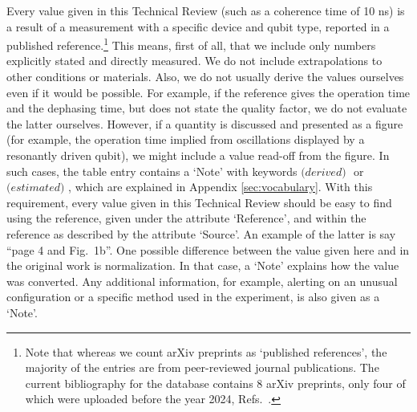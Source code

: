 \documentclass[aps, prx, showpacs, twocolumn, superscriptaddress, notitlepage, longbibliography, floatfix, nofootinbib]{revtex4-2}
\newcommand{\estimated}{\textit{(estimated) }}
\newcommand{\derived}{\textit{(derived) }}
\newcommand{\myKey}[1]{$\whitearrowupfrombar$\textit{#1}}
\renewcommand{\myKey}[1]{\textit{#1}}
\renewcommand{\myKey}[1]{`{#1}'}
\newcommand{\recheck}[1]{{#1}}
\begin{document}
Every value given in this Technical Review (such as a coherence time of 10 ns) is a result of a measurement with a specific device and qubit type, reported in a published reference.\footnote{\recheck{Note that whereas we count arXiv preprints as `published references', the majority of the entries are from peer-reviewed journal publications. The current bibliography for the database contains 8 arXiv preprints, only four of which were uploaded before the year 2024, Refs.~\cite{hayes_lifetime_2009,cerfontaine_feedback-tuned_2016,ruffino_integrated_2021}.}} This means, first of all, that we include only numbers explicitly stated and directly measured. We do not include extrapolations to other conditions or materials. Also, we do not usually derive the values ourselves even if it would be possible. For example, if the reference gives the operation time and the dephasing time, but does not state the quality factor, we do not evaluate the latter ourselves. However, if a quantity is discussed and presented as a figure (for example, the operation time implied from oscillations displayed by a resonantly driven qubit), we might include a value read-off from the figure. In such cases, the table entry contains a \myKey{Note} with keywords $\derived$\! or $\estimated$\!, which are explained in Appendix \ref{sec:vocabulary}. With this requirement, every value given in this Technical Review should be easy to find using the reference, given under the attribute \myKey{Reference}, and within the reference as described by the attribute \myKey{Source}. An example of the latter is say ``page 4 and Fig.~1b''. One possible difference between the value given here and in the original work is normalization. In that case, a \myKey{Note} explains how the value was converted. Any additional information, for example, alerting on an unusual configuration or a specific method used in the experiment, is also given as a \myKey{Note}. 
\end{document}
